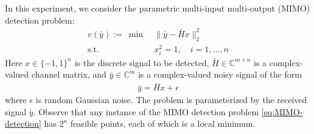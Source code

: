 \documentclass[10pt]{article} %
\theoremstyle{plain}
\theoremstyle{definition}
\theoremstyle{remark}
\begin{document}
In this experiment, we consider the parametric multi-input multi-output (MIMO) detection problem:
\begin{align}
    v(\bar{y}) :=~\min~&\|\bar{y} - \bar{H}x\|_2^2 \label{eq:MIMO-detection}\\
    \text{s.t.}~& x_i^2 = 1, \quad i=1,...,n \nonumber
\end{align}
Here $x \in \{-1, 1\}^n$ is the discrete signal to be detected, $\bar{H} \in \mathbb{C}^{m \times n}$ is a complex-valued channel matrix, and $\bar{y} \in \mathbb{C}^m$ is a complex-valued noisy signal of the form
\begin{align}
    \bar{y} = \bar{H} x + \epsilon \label{eq:noisy-signal}
\end{align}
where $\epsilon$ is random Gaussian noise. The problem is parameterized by the received signal $\bar{y}$. Observe that any instance of the MIMO detection problem \eqref{eq:MIMO-detection} has $2^n$ feasible points, each of which is a local minimum.
\end{document}
